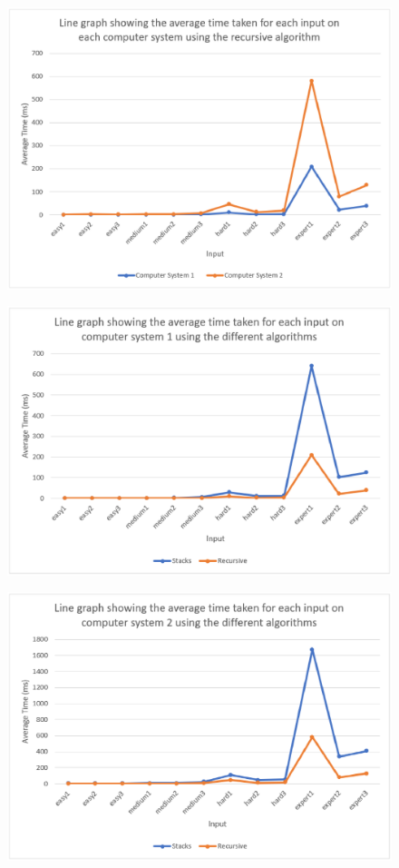 \documentclass[11pt]{article}
\begin{document}
\begin{figure}[H]
\centering
\includegraphics[scale=0.54]{fig6.eps}
\caption{ }
\end{figure}

\begin{figure}[H]
\centering
\includegraphics[scale=0.54]{fig7.eps}
\caption{ }
\end{figure}

\begin{figure}[H]
\centering
\includegraphics[scale=0.54]{fig8.eps}
\caption{ }
\end{figure}
\end{document}
